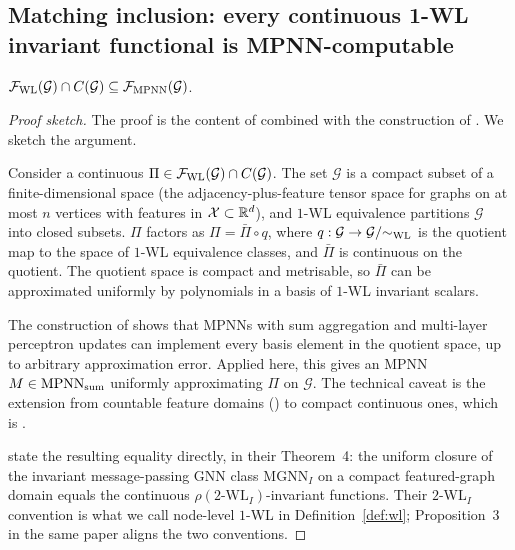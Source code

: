 \subsection{Matching inclusion: every continuous 1-WL invariant functional is MPNN-computable}

\begin{proposition}\label{prop:lower}
$\mathcal{F}_{\mathrm{WL}}(\mathcal{G}) \cap C(\mathcal{G}) \subseteq
\mathcal{F}_{\mathrm{MPNN}}(\mathcal{G})$.
\end{proposition}

\begin{proof}[Proof sketch]
The proof is the content of \citet[Theorem~4]{AzizianLelarge2021}
combined with the construction of \citet[Theorem~3, Corollary~6]{XuGIN2019}.
We sketch the argument.

Consider a continuous $\Pi \in \mathcal{F}_{\mathrm{WL}}(\mathcal{G}) \cap
C(\mathcal{G})$. The set $\mathcal{G}$ is a compact subset of a
finite-dimensional space (the adjacency-plus-feature tensor space
for graphs on at most $n$ vertices with features in $\mathcal{X}
\subset \mathbb{R}^d$), and $1$-WL equivalence partitions $\mathcal{G}$ into
closed subsets. $\Pi$ factors as $\Pi = \bar\Pi \circ q$, where $q :
\mathcal{G} \to \mathcal{G}/{\sim_{\mathrm{WL}}}$ is the quotient map to the
space of $1$-WL equivalence classes, and $\bar\Pi$ is continuous on
the quotient. The quotient space is compact and metrisable, so
$\bar\Pi$ can be approximated uniformly by polynomials in a basis of
$1$-WL invariant scalars.

The construction of \citet{XuGIN2019} shows that MPNNs with sum
aggregation and multi-layer perceptron updates can implement every
basis element in the quotient space, up to arbitrary approximation
error. Applied here, this gives an MPNN $M \in \mathrm{MPNN}_{\mathrm{sum}}$
uniformly approximating $\Pi$ on $\mathcal{G}$. The technical caveat
is the extension from countable feature domains (\citet{XuGIN2019}) to
compact continuous ones, which is \citet[Theorems~3,
4]{ChenVillar2019}.

\citet{AzizianLelarge2021} state the resulting equality directly, in
their Theorem~4: the uniform closure of the invariant message-passing
GNN class $\mathrm{MGNN}_I$ on a compact featured-graph domain equals
the continuous $\rho(2\text{-WL}_I)$-invariant functions. Their $2$-WL$_I$
convention is what we call node-level $1$-WL in Definition~\ref{def:wl};
Proposition~3 in the same paper aligns the two conventions.
\end{proof}

